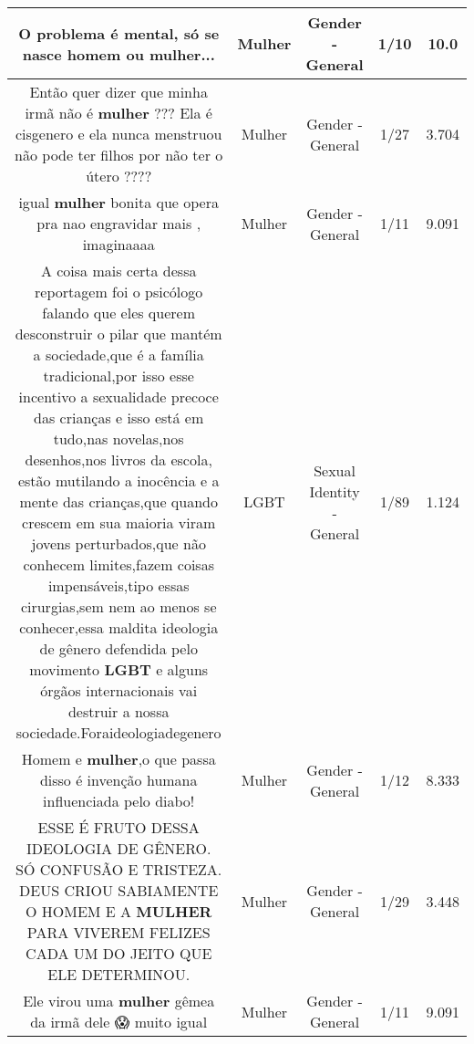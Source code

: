 \documentclass[11pt]{article}
\newlength\mylength
\begin{document}
\begin{center}
\begin{longtable}{|C{.65\mylength}|C{.30\mylength}|C{.12\mylength}|C{.12\mylength}|C{.12\mylength}|}
  \small O problema é mental, só se nasce homem ou \textbf{mulher}...\normalsize   & Mulher & Gender - General & 1/10 & 10.0 \\  \hline
  \small Então quer dizer que minha irmã não é \textbf{mulher} ??? Ela é cisgenero e ela nunca menstruou não pode ter filhos por não ter o útero ????\normalsize   & Mulher & Gender - General & 1/27 & 3.704 \\  \hline
  \small igual \textbf{mulher} bonita que opera pra nao engravidar mais , imaginaaaa\normalsize   & Mulher & Gender - General & 1/11 & 9.091 \\  \hline
  \small A coisa mais certa dessa reportagem foi o psicólogo falando que eles querem desconstruir o pilar que mantém a sociedade,que é a família tradicional,por isso esse incentivo a sexualidade precoce das crianças e isso está em tudo,nas novelas,nos desenhos,nos livros da escola, estão mutilando a inocência e a mente das crianças,que quando crescem em sua maioria viram jovens perturbados,que não conhecem limites,fazem coisas impensáveis,tipo essas cirurgias,sem nem ao menos se conhecer,essa maldita ideologia de gênero defendida pelo movimento \textbf{LGBT} e alguns órgãos internacionais vai destruir a nossa sociedade.Foraideologiadegenero\normalsize   & LGBT & Sexual Identity - General & 1/89 & 1.124 \\  \hline
  \small Homem e \textbf{mulher},o que passa disso é invenção humana influenciada pelo diabo!\normalsize   & Mulher & Gender - General & 1/12 & 8.333 \\  \hline
  \small ESSE É FRUTO DESSA IDEOLOGIA DE GÊNERO. SÓ CONFUSÃO  E TRISTEZA. DEUS CRIOU SABIAMENTE O HOMEM E A \textbf{MULHER} PARA VIVEREM FELIZES CADA UM DO JEITO QUE ELE DETERMINOU.\normalsize   & Mulher & Gender - General & 1/29 & 3.448 \\  \hline
  \small Ele virou uma \textbf{mulher} gêmea da irmã dele 😱 muito igual\normalsize   & Mulher & Gender - General & 1/11 & 9.091 \\  \hline

\end{longtable}
\end{center}
\end{document}
